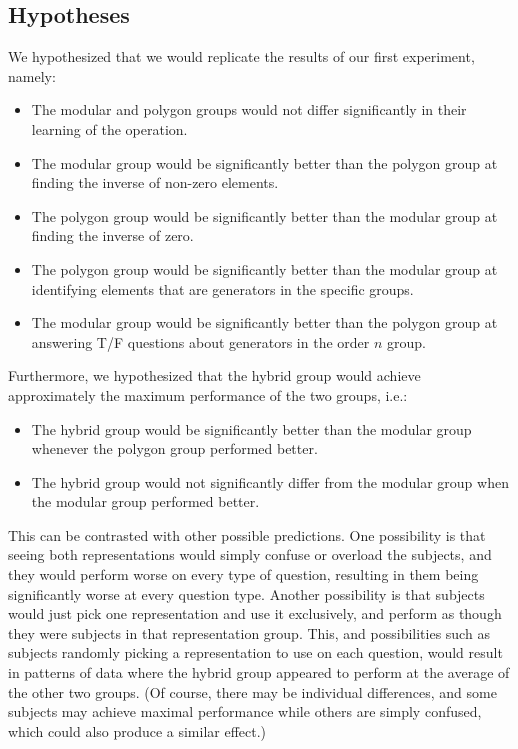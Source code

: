 \documentclass[11pt]{article}
\begin{document}
\subsection{Hypotheses}
We hypothesized that we would replicate the results of our first experiment, namely: 
\begin{itemize} 
\item The modular and polygon groups would not differ significantly in their learning of the operation.
\item The modular group would be significantly better than the polygon group at finding the inverse of non-zero elements.
\item The polygon group would be significantly better than the modular group at finding the inverse of zero.
\item The polygon group would be significantly better than the modular group at identifying elements that are generators in the specific groups.
\item The modular group would be significantly better than the polygon group at answering T/F questions about generators in the order $n$ group.
\end{itemize}
Furthermore, we hypothesized that the hybrid group would achieve approximately the maximum performance of the two groups, i.e.:
\begin{itemize}
\item The hybrid group would be significantly better than the modular group whenever the polygon group performed better.
\item The hybrid group would not significantly differ from the modular group when the modular group performed better.
\end{itemize}
This can be contrasted with other possible predictions. One possibility is that seeing both representations would simply confuse or overload the subjects, and they would perform worse on every type of question, resulting in them being significantly worse at every question type. Another possibility is that subjects would just pick one representation and use it exclusively, and perform as though they were subjects in that representation group. This, and possibilities such as subjects randomly picking a representation to use on each question, would result in patterns of data where the hybrid group appeared to perform at the average of the other two groups. (Of course, there may be individual differences, and some subjects may achieve maximal performance while others are simply confused, which could also produce a similar effect.)
\end{document}
